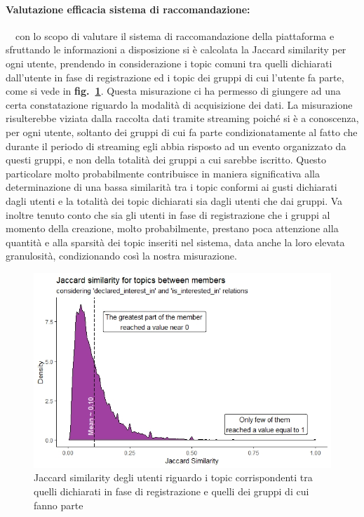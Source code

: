 \documentclass[fleqn,10pt]{SelfArx} %
\begin{document}
{\paragraph{Valutazione efficacia sistema di raccomandazione:} $~~~$ con lo scopo di valutare il sistema di raccomandazione della piattaforma e sfruttando le informazioni a disposizione si è calcolata la Jaccard similarity per ogni utente, prendendo in considerazione i topic comuni tra quelli dichiarati dall'utente in fase di registrazione ed i topic dei gruppi di cui l'utente fa parte, come si vede in \textbf{fig.~\ref{jaccard_similarity}}. 
Questa misurazione ci ha permesso di giungere ad una certa constatazione riguardo la modalità di acquisizione dei dati. 
La misurazione risulterebbe viziata dalla raccolta dati tramite streaming poiché si è a conoscenza, per ogni utente, soltanto dei gruppi di cui fa parte condizionatamente al fatto che durante il periodo di streaming egli abbia risposto ad un evento organizzato da questi gruppi, e non della totalità dei gruppi a cui sarebbe iscritto. 
Questo particolare molto probabilmente contribuisce in maniera significativa alla determinazione di una bassa similarità tra i topic conformi ai gusti dichiarati dagli utenti e la totalità dei topic dichiarati sia dagli utenti che dai gruppi. 
Va inoltre tenuto conto che sia gli utenti in fase di registrazione che i gruppi al momento della creazione, molto probabilmente, prestano poca attenzione alla quantità e alla sparsità dei topic inseriti nel sistema, data anche la loro elevata granulosità, condizionando così la nostra misurazione. 
\begin{figure}
\centering
\includegraphics[width = 8.7 cm, height = 5 cm]{jaccard_similarity.jpeg}
\vspace*{0.01cm}
\caption{\footnotesize \label{jaccard_similarity} Jaccard similarity degli utenti riguardo i topic corrispondenti tra quelli dichiarati in fase di registrazione e quelli dei gruppi di cui fanno parte}
\end{figure}
}
\end{document}
